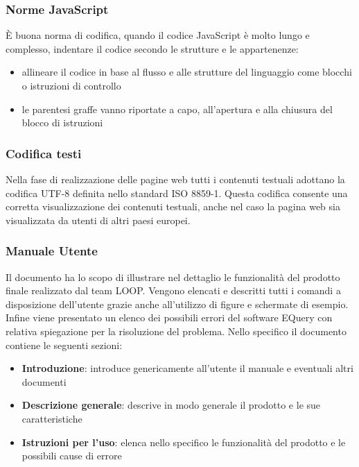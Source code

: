 \documentclass[a4paper,11pt]{article}
\begin{document}
\subsubsection{Norme JavaScript}
\`E buona norma di codifica, quando il codice JavaScript \`e molto lungo e complesso, indentare il codice secondo le strutture e le appartenenze:
\begin{itemize}
\item allineare il codice in base al flusso e alle strutture del linguaggio come blocchi o istruzioni di controllo
\item le parentesi graffe vanno riportate a capo, all'apertura e alla chiusura del blocco di istruzioni
\end{itemize}
\subsubsection{Codifica testi}
Nella fase di realizzazione delle pagine web tutti i contenuti testuali adottano la codifica UTF-8 definita nello standard ISO 8859-1. Questa codifica consente una corretta visualizzazione dei contenuti testuali, anche nel caso la pagina web sia visualizzata da utenti di altri paesi europei.

\subsubsection{Manuale Utente}
Il documento ha lo scopo di illustrare nel dettaglio le funzionalit\`a del prodotto finale realizzato dal team LOOP. Vengono elencati e descritti tutti i comandi a disposizione dell'utente grazie anche all'utilizzo di figure e schermate di esempio. Infine viene presentato un elenco dei possibili errori del software EQuery con relativa spiegazione per la risoluzione del problema. Nello specifico il documento contiene le seguenti sezioni:
\begin{itemize}
\item \textbf{Introduzione}: introduce genericamente all'utente il manuale e eventuali altri documenti
\item \textbf{Descrizione generale}: descrive in modo generale il prodotto e le sue caratteristiche 
\item \textbf{Istruzioni per l'uso}: elenca nello specifico le funzionalit\`a del prodotto e le possibili cause di errore 
\end{itemize} 
\end{document}
